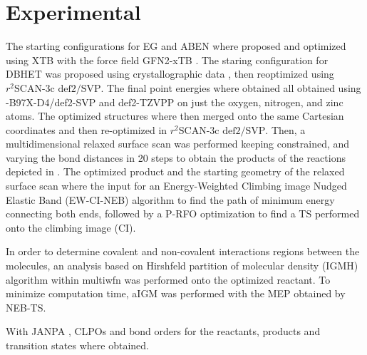 \section{Experimental}
\label{sec:experimental}

The starting configurations for EG and ABEN where proposed and optimized using XTB \cite{Bannwarth2021} with the force field GFN2-xTB \cite{Bannwarth2019}. The staring configuration for DBHET was proposed using crystallographic data \cite{Daubeny1954}, then reoptimized using $r^2\textrm{SCAN-3c}\textrm{ def2/SVP}$. The final point energies where obtained all obtained using \chemomega-B97X-D4/def2-SVP and def2-TZVPP on just the oxygen, nitrogen, and  zinc atoms.
The optimized structures where then merged onto the same Cartesian coordinates and then re-optimized in $r^2\textrm{SCAN-3c}\textrm{ def2/SVP}$. Then, a multidimensional relaxed surface scan was performed keeping constrained, and varying the bond distances in 20 steps to obtain the products of the reactions depicted in . The optimized product and the starting geometry of the relaxed surface scan where the input for an Energy-Weighted Climbing image Nudged Elastic Band (EW-CI-NEB) \cite{Asgeirsson2021} algorithm to find the path of minimum energy connecting both ends, followed by a P-RFO optimization to find a TS performed onto the climbing image (CI).

In order to determine covalent and non-covalent interactions regions between the molecules, an analysis based on Hirshfeld partition of molecular density (IGMH) algorithm within multiwfn was performed \cite{Lu2021} onto the optimized reactant. To minimize computation time, aIGM was performed with the MEP obtained by NEB-TS.

With JANPA \cite{Nikolaienko2014}, CLPOs and bond orders for the reactants, products and transition states where obtained.